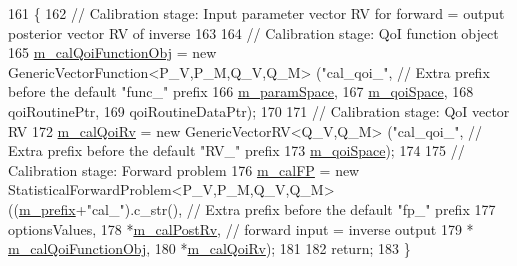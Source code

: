 \begin{DoxyCode}
161 \{
162   \textcolor{comment}{// Calibration stage: Input parameter vector RV for forward = output posterior vector RV of inverse}
163 
164   \textcolor{comment}{// Calibration stage: QoI function object}
165   \hyperlink{class_q_u_e_s_o_1_1_validation_cycle_ab891acfabc02b5e590deee6e05e30b2c}{m\_calQoiFunctionObj} = \textcolor{keyword}{new} GenericVectorFunction<P\_V,P\_M,Q\_V,Q\_M> (\textcolor{stringliteral}{"cal\_qoi\_"}, \textcolor{comment}{// Extra
       prefix before the default "func\_" prefix}
166                                                                            
      \hyperlink{class_q_u_e_s_o_1_1_validation_cycle_a641d2e59aed41a93a787c71ec30b6e07}{m\_paramSpace},
167                                                                            
      \hyperlink{class_q_u_e_s_o_1_1_validation_cycle_adccd6175c04258a6f603a92a7ae4327c}{m\_qoiSpace},
168                                                                            qoiRoutinePtr,
169                                                                            qoiRoutineDataPtr);
170 
171   \textcolor{comment}{// Calibration stage: QoI vector RV}
172   \hyperlink{class_q_u_e_s_o_1_1_validation_cycle_ac3bac139c827b3210e92d4bac190f89f}{m\_calQoiRv} = \textcolor{keyword}{new} GenericVectorRV<Q\_V,Q\_M> (\textcolor{stringliteral}{"cal\_qoi\_"}, \textcolor{comment}{// Extra prefix before the default "RV\_"
       prefix}
173                                                     \hyperlink{class_q_u_e_s_o_1_1_validation_cycle_adccd6175c04258a6f603a92a7ae4327c}{m\_qoiSpace});
174 
175   \textcolor{comment}{// Calibration stage: Forward problem}
176   \hyperlink{class_q_u_e_s_o_1_1_validation_cycle_ab91bdb2d36652abb6275af640f2844bd}{m\_calFP} = \textcolor{keyword}{new} StatisticalForwardProblem<P\_V,P\_M,Q\_V,Q\_M> ((\hyperlink{class_q_u_e_s_o_1_1_validation_cycle_adcc61017a11c99f3a6189ddbf7bc76fc}{m\_prefix}+\textcolor{stringliteral}{"cal\_"}).c\_str(), \textcolor{comment}{//
       Extra prefix before the default "fp\_" prefix}
177                                                                    optionsValues,
178                                                                    *\hyperlink{class_q_u_e_s_o_1_1_validation_cycle_a535b6447a44ac7191e12e887d1710ef0}{m\_calPostRv}, \textcolor{comment}{// forward
       input = inverse output}
179                                                                    *
      \hyperlink{class_q_u_e_s_o_1_1_validation_cycle_ab891acfabc02b5e590deee6e05e30b2c}{m\_calQoiFunctionObj},
180                                                                    *\hyperlink{class_q_u_e_s_o_1_1_validation_cycle_ac3bac139c827b3210e92d4bac190f89f}{m\_calQoiRv});
181 
182   \textcolor{keywordflow}{return};
183 \}
\end{DoxyCode}
